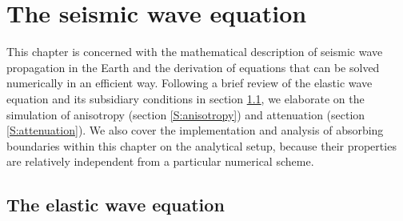 \chapter{The seismic wave equation}\label{C:AnalyticalSetup}

This chapter is concerned with the mathematical description of
seismic wave propagation in the Earth and the derivation of
equations that can be solved numerically in an efficient way.
Following a brief review of the elastic wave equation and its
subsidiary conditions in section \ref{S:wave_equation}, we elaborate
on the simulation of anisotropy (section \ref{S:anisotropy}) and
attenuation (section \ref{S:attenuation}). We also cover the
implementation and analysis of absorbing boundaries within this
chapter on the analytical setup, because their properties are
relatively independent from a particular numerical scheme.

\section{The elastic wave equation}\label{S:wave_equation}


